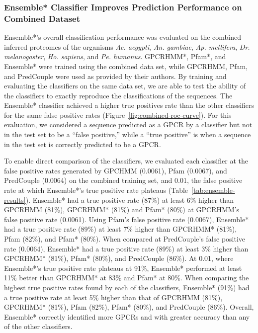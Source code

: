 \subsubsection{Ensemble* Classifier Improves Prediction Performance on Combined Dataset}

Ensemble*'s overall classification performance was evaluated on the combined inferred proteomes of the organisms \emph{Ae. aegypti}, \emph{An. gambiae}, \emph{Ap. mellifera}, \emph{Dr. melanogaster}, \emph{Ho. sapiens}, and \emph{Pe. humanus}.  GPCRHMM*, Pfam*, and Ensemble* were trained using the combined data set, while GPCRHMM, Pfam, and PredCouple were used as provided by their authors.  By training and evaluating the classifiers on the same data set, we are able to test the ability of the classifiers to exactly reproduce the classifications of the sequences. The Ensemble* classifier achieved a higher true positives rate than the other classifiers for the same false positive rates (Figure~\ref{fig:combined-roc-curve}).  For this evaluation, we considered a sequence predicted as a GPCR by a classifier but not in the test set to be a ``false positive,'' while a ``true positive'' is when a sequence in the test set is correctly predicted to be a GPCR.

To enable direct comparison of the classifiers, we evaluated each classifier at the false positive rates generated by GPCHMM (0.0061), Pfam (0.0067), and PredCouple (0.0064) on the combined training set, and 0.01, the false positive rate at which Ensemble*'s true positive rate plateaus (Table~\ref{tab:ensemble-results}).  Ensemble* had a true positive rate (87\%) at least 6\% higher than GPCRHMM (81\%), GPCRHMM* (81\%) and Pfam* (80\%) at GPCRHMM's false positive rate (0.0061).  Using Pfam's false positive rate (0.0067), Ensemble* had a true positive rate (89\%) at least 7\% higher than GPCRHMM* (81\%), Pfam (82\%), and Pfam* (80\%). When compared at PredCouple's false positive rate (0.0064), Ensemble* had a true positive rate (89\%) at least 3\% higher than GPCRHMM* (81\%), Pfam* (80\%), and PredCouple (86\%).  At 0.01, where Ensemble*'s true positive rate plateaus at 91\%, Ensemble* performed at least 11\% better than GPCRHMM* at 83\% and Pfam* at 80\%.  When comparing the highest true positive rates found by each of the classifiers, Ensemble* (91\%) had a true positive rate at least 5\% higher than that of GPCRHMM (81\%), GPCRHMM* (81\%), Pfam (82\%), Pfam* (80\%), and PredCouple (86\%).  Overall, Ensemble* correctly identified more GPCRs and with greater accuracy than any of the other classifiers.


